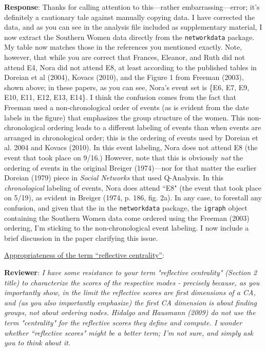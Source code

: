 \documentclass{article}
\begin{document}
\textbf{Response}: Thanks for calling attention to this---rather embarrassing---error; it's definitely a cautionary tale against manually copying data. I have corrected the data, and as you can see in the analysis file included as supplementary material, I now extract the Southern Women data directly from the \texttt{networkdata} package. My table now matches those in the references you mentioned exactly. Note, however, that while you are correct that Frances, Eleanor, and Ruth did not attend E4, Nora did not attend E8, at least according to the published tables in Doreian et al (2004), Kovacs (2010), and the Figure 1 from Freeman (2003), shown above; in these papers, as you can see, Nora's event set is \{E6, E7, E9, E10, E11, E12, E13, E14\}. I think the confusion comes from the fact that Freeman used a non-chronological order of events (as is evident from the date labels in the figure) that emphasizes the group structure of the women. This non-chronological ordering leads to a different labeling of events than when events are arranged in chronological order; this is the ordering of events used by Doreian et al. 2004 and Kovacs (2010). In this event labeling, Nora does not attend E8 (the event that took place on 9/16.) However, note that this is obviously \textit{not} the ordering of events in the original Breiger (1974)---nor for that matter the earlier Doreian (1979) piece in \textit{Social Networks} that used Q-Analysis. In this \textit{chronological} labeling of events, Nora does attend ``E8" (the event that took place on 5/19), as evident in Breiger (1974, p. 186, fig. 2a). In any case, to forestall any confusion, and given that the in the \texttt{networkdata} package, the \texttt{igraph} object containing the Southern Women data come ordered using the Freeman (2003) ordering, I'm sticking to the non-chronological event labeling. I now include a brief discussion in the paper clarifying this issue. 



\underline{Appropriateness of the term ``reflective centrality''}:

\textbf{Reviewer}: \textit{I have some resistance to your term "reflective centrality" (Section 2 title) to characterize the scores of the respective modes - precisely because, as you importantly show, in the limit the reflective scores are first dimensions of a CA, and (as you also importantly emphasize) the first CA dimension is about finding groups, not about ordering nodes. Hidalgo and Hausmann (2009) do not use the term "centrality" for the reflective scores they define and compute. I wonder whether ``reflective scores" might be a better term; I'm not sure, and simply ask you to think about it.}
\end{document}
